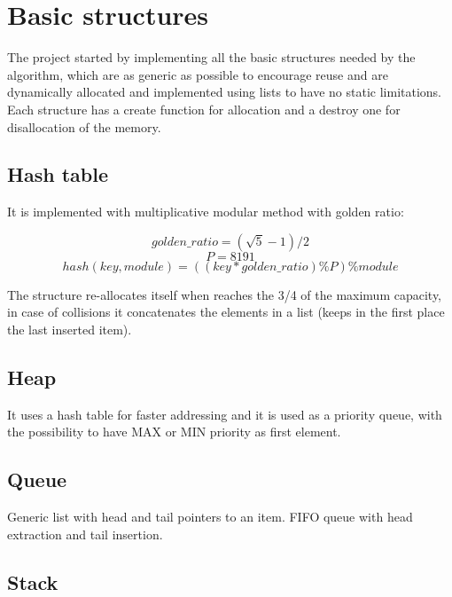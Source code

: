 \section{Basic structures}
\label{Sec:basic_structures}

The project started by implementing all the basic structures needed by the algorithm, which are as generic as possible to encourage reuse and are dynamically allocated and implemented using lists to have no static limitations.
\\
Each structure has a create function for allocation and a destroy one for disallocation of the memory.

\subsection{Hash table}
\label{hash_table}

It is implemented with multiplicative modular method with golden ratio:

\begin{equation}
    golden\_ratio = (\sqrt{5} - 1)/2
\end{equation}
\begin{equation}
    P = 8191
\end{equation}
\begin{equation}
    hash(key, module) = ((key*golden\_ratio)\%P)\%module
\end{equation}

The structure re-allocates itself when reaches the 3/4 of the maximum capacity, in case of collisions it concatenates the elements in a list (keeps in the first place the last inserted item).

\subsection{Heap}
\label{heap}

It uses a hash table for faster addressing and it is used as a priority queue, with the possibility to have MAX or MIN priority as first element.

\subsection{Queue}

Generic list with head and tail pointers to an item. FIFO queue with head extraction and tail insertion.

\subsection{Stack}
\label{stack}

